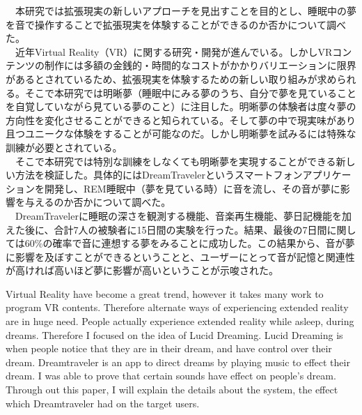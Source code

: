 
\begin{jabstract}
　本研究では拡張現実の新しいアプローチを見出すことを目的とし、睡眠中の夢を音で操作することで拡張現実を体験することができるのか否かについて調べた。\\
　近年Virtual Reality（VR）に関する研究・開発が進んでいる。しかしVRコンテンツの制作には多額の金銭的・時間的なコストがかかりバリエーションに限界があるとされているため、拡張現実を体験するための新しい取り組みが求められる。そこで本研究では明晰夢（睡眠中にみる夢のうち、自分で夢を見ていることを自覚していながら見ている夢のこと）に注目した。明晰夢の体験者は度々夢の方向性を変化させることができると知られている。そして夢の中で現実味があり且つユニークな体験をすることが可能なのだ。しかし明晰夢を試みるには特殊な訓練が必要とされている。\\
　そこで本研究では特別な訓練をしなくても明晰夢を実現することができる新しい方法を検証した。具体的にはDreamTravelerというスマートフォンアプリケーションを開発し、REM睡眠中（夢を見ている時）に音を流し、その音が夢に影響を与えるのか否かについて調べた。\\ 
　DreamTravelerに睡眠の深さを観測する機能、音楽再生機能、夢日記機能を加えた後に、合計7人の被験者に15日間の実験を行った。結果、最後の7日間に関しては60\%の確率で音に連想する夢をみることに成功した。この結果から、音が夢に影響を及ぼすことができるということと、ユーザーにとって音が記憶と関連性が高ければ高いほど夢に影響が高いということが示唆された。

\end{jabstract}

\begin{eabstract}
	Virtual Reality have become a great trend, however it takes many work to program VR contents. Therefore alternate ways of experiencing extended reality are in huge need. People actually experience extended reality while asleep, during dreams. Therefore I focused on the idea of Lucid Dreaming. Lucid Dreaming is when people notice that they are in their dream, and have control over their dream. Dreamtraveler is an app to direct dreams by playing music to effect their dream. I was able to prove that certain sounds have effect on people's dream. Through out this paper, I will explain the details about the system, the effect which Dreamtraveler had on the target users.
\end{eabstract}
